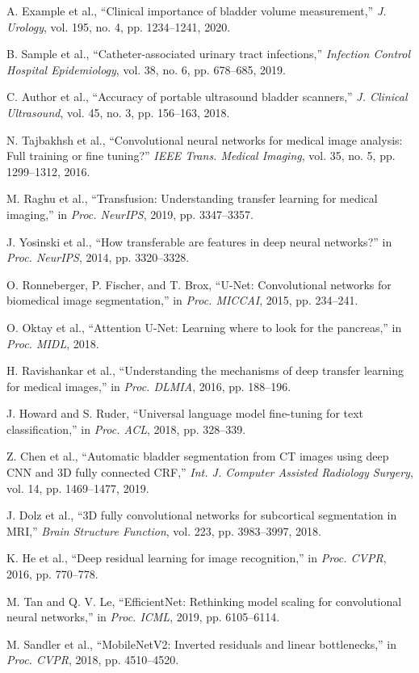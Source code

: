 \documentclass{article}
\begin{document}

\begin{thebibliography}{99}

A. Example et al., ``Clinical importance of bladder volume measurement,'' \textit{J. Urology}, vol. 195, no. 4, pp. 1234--1241, 2020.

B. Sample et al., ``Catheter-associated urinary tract infections,'' \textit{Infection Control Hospital Epidemiology}, vol. 38, no. 6, pp. 678--685, 2019.

C. Author et al., ``Accuracy of portable ultrasound bladder scanners,'' \textit{J. Clinical Ultrasound}, vol. 45, no. 3, pp. 156--163, 2018.

N. Tajbakhsh et al., ``Convolutional neural networks for medical image analysis: Full training or fine tuning?'' \textit{IEEE Trans. Medical Imaging}, vol. 35, no. 5, pp. 1299--1312, 2016.

M. Raghu et al., ``Transfusion: Understanding transfer learning for medical imaging,'' in \textit{Proc. NeurIPS}, 2019, pp. 3347--3357.

J. Yosinski et al., ``How transferable are features in deep neural networks?'' in \textit{Proc. NeurIPS}, 2014, pp. 3320--3328.

O. Ronneberger, P. Fischer, and T. Brox, ``U-Net: Convolutional networks for biomedical image segmentation,'' in \textit{Proc. MICCAI}, 2015, pp. 234--241.

O. Oktay et al., ``Attention U-Net: Learning where to look for the pancreas,'' in \textit{Proc. MIDL}, 2018.

H. Ravishankar et al., ``Understanding the mechanisms of deep transfer learning for medical images,'' in \textit{Proc. DLMIA}, 2016, pp. 188--196.

J. Howard and S. Ruder, ``Universal language model fine-tuning for text classification,'' in \textit{Proc. ACL}, 2018, pp. 328--339.

Z. Chen et al., ``Automatic bladder segmentation from CT images using deep CNN and 3D fully connected CRF,'' \textit{Int. J. Computer Assisted Radiology Surgery}, vol. 14, pp. 1469--1477, 2019.

J. Dolz et al., ``3D fully convolutional networks for subcortical segmentation in MRI,'' \textit{Brain Structure Function}, vol. 223, pp. 3983--3997, 2018.

K. He et al., ``Deep residual learning for image recognition,'' in \textit{Proc. CVPR}, 2016, pp. 770--778.

M. Tan and Q. V. Le, ``EfficientNet: Rethinking model scaling for convolutional neural networks,'' in \textit{Proc. ICML}, 2019, pp. 6105--6114.

M. Sandler et al., ``MobileNetV2: Inverted residuals and linear bottlenecks,'' in \textit{Proc. CVPR}, 2018, pp. 4510--4520.

\end{thebibliography}
\end{document}
